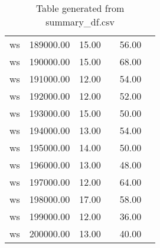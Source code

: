 \begin{table}[ht]
\begin{table}[ht]
\begin{tabular}{|cccccc}
  ws & 189000.00 & 15.00 &  & 56.00 &  \\ 
  ws & 190000.00 & 15.00 &  & 68.00 &  \\ 
  ws & 191000.00 & 12.00 &  & 54.00 &  \\ 
  ws & 192000.00 & 12.00 &  & 52.00 &  \\ 
  ws & 193000.00 & 15.00 &  & 50.00 &  \\ 
  ws & 194000.00 & 13.00 &  & 54.00 &  \\ 
  ws & 195000.00 & 14.00 &  & 50.00 &  \\ 
  ws & 196000.00 & 13.00 &  & 48.00 &  \\ 
  ws & 197000.00 & 12.00 &  & 64.00 &  \\ 
  ws & 198000.00 & 17.00 &  & 58.00 &  \\ 
  ws & 199000.00 & 12.00 &  & 36.00 &  \\ 
  ws & 200000.00 & 13.00 &  & 40.00 &  \\ 
   \hline
\end{tabular}
\caption{Table generated from summary_df.csv} 
\end{table}
\end{table}
